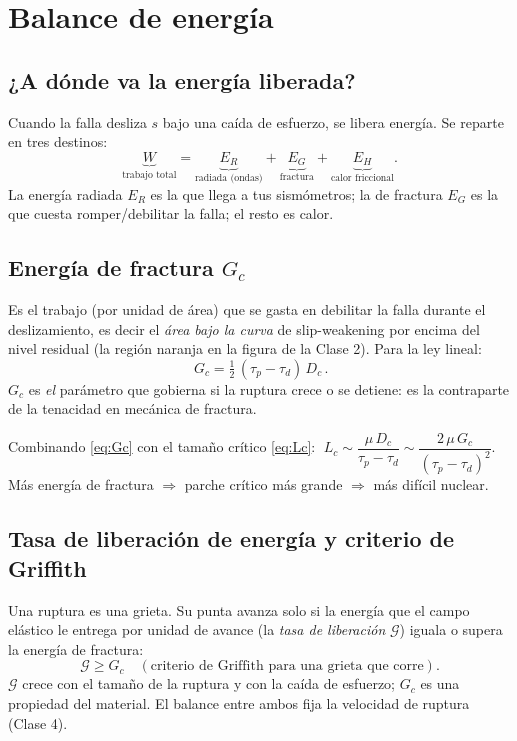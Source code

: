\documentclass[11pt,a4paper]{article}
\newcommand{\Dc}{D_c}
\newcommand{\taup}{\tau_p}
\newcommand{\taud}{\tau_d}
\begin{document}
\section{Balance de energía}

\subsection{¿A dónde va la energía liberada?}
Cuando la falla desliza $s$ bajo una caída de esfuerzo, se libera energía. Se
reparte en tres destinos:
\begin{equation}
  \underbrace{W}_{\text{trabajo total}}=
  \underbrace{E_R}_{\text{radiada (ondas)}}+
  \underbrace{E_G}_{\text{fractura}}+
  \underbrace{E_H}_{\text{calor friccional}}.
\end{equation}
La energía radiada $E_R$ es la que llega a tus sismómetros; la de fractura $E_G$
es la que cuesta romper/debilitar la falla; el resto es calor.

\subsection{Energía de fractura $G_c$}
Es el trabajo (por unidad de área) que se gasta en debilitar la falla durante el
deslizamiento, es decir el \emph{área bajo la curva} de slip-weakening por encima
del nivel residual (la región naranja en la figura de la Clase 2). Para la ley
lineal:
\begin{equation}
  \boxed{\,G_c = \tfrac12\,(\taup-\taud)\,\Dc\,}.
  \label{eq:Gc}
\end{equation}
$G_c$ es \emph{el} parámetro que gobierna si la ruptura crece o se detiene: es la
contraparte de la tenacidad en mecánica de fractura.

\begin{keybox}
Combinando \eqref{eq:Gc} con el tamaño crítico \eqref{eq:Lc}:
$\;L_c \sim \dfrac{\mu\,\Dc}{\taup-\taud}\sim \dfrac{2\,\mu\,G_c}{(\taup-\taud)^2}$.
Más energía de fractura $\Rightarrow$ parche crítico más grande $\Rightarrow$
más difícil nuclear.
\end{keybox}

\subsection{Tasa de liberación de energía y criterio de Griffith}
Una ruptura es una grieta. Su punta avanza solo si la energía que el campo
elástico le entrega por unidad de avance (la \emph{tasa de liberación}
$\mathcal{G}$) iguala o supera la energía de fractura:
\begin{equation}
  \mathcal{G} \ge G_c \quad(\text{criterio de Griffith para una grieta que corre}).
\end{equation}
$\mathcal{G}$ crece con el tamaño de la ruptura y con la caída de esfuerzo; $G_c$
es una propiedad del material. El balance entre ambos fija la velocidad de
ruptura (Clase 4).
\end{document}
